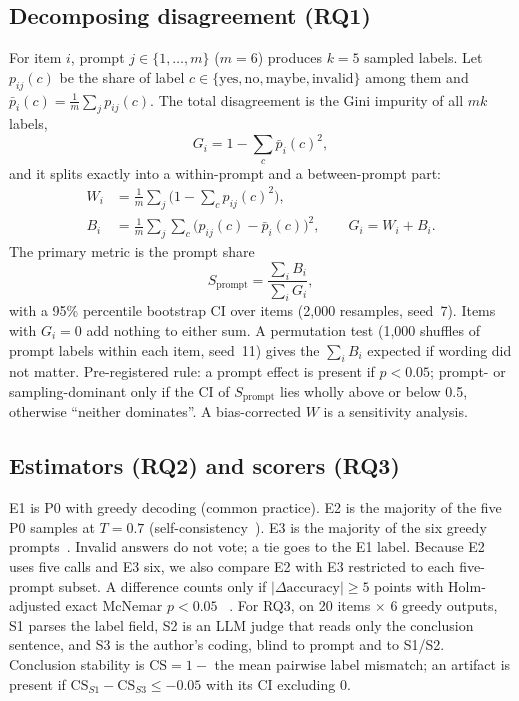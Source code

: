 \documentclass[conference]{IEEEtran}
\newcommand{\Sp}{S_{\mathrm{prompt}}}
\begin{document}
\subsection{Decomposing disagreement (RQ1)}
For item $i$, prompt $j \in \{1,\dots,m\}$ ($m = 6$) produces $k = 5$
sampled labels. Let $p_{ij}(c)$ be the share of label
$c \in \{\text{yes},\text{no},\text{maybe},\text{invalid}\}$ among them and
$\bar p_i(c) = \frac{1}{m}\sum_j p_{ij}(c)$. The total disagreement is the
Gini impurity of all $mk$ labels,
\begin{equation}
G_i = 1 - \sum_c \bar p_i(c)^2 ,
\end{equation}
and it splits exactly into a within-prompt and a between-prompt part:
\begin{align}
W_i &= \frac{1}{m}\sum_j \Big(1 - \sum_c p_{ij}(c)^2\Big),\\
B_i &= \frac{1}{m}\sum_j \sum_c \big(p_{ij}(c) - \bar p_i(c)\big)^2,
\qquad G_i = W_i + B_i .
\end{align}
The primary metric is the prompt share
\begin{equation}
\Sp = \frac{\sum_i B_i}{\sum_i G_i},
\end{equation}
with a 95\% percentile bootstrap CI over items (2{,}000 resamples,
seed~7). Items with $G_i = 0$ add nothing to either sum. A permutation
test (1{,}000 shuffles of prompt labels within each item, seed~11) gives
the $\sum_i B_i$ expected if wording did not matter. Pre-registered rule:
a prompt effect is present if $p < 0.05$; prompt- or sampling-dominant
only if the CI of $\Sp$ lies wholly above or below 0.5, otherwise
``neither dominates''. A bias-corrected $W$ is a sensitivity analysis.

\subsection{Estimators (RQ2) and scorers (RQ3)}
E1 is P0 with greedy decoding (common practice). E2 is the majority of
the five P0 samples at $T = 0.7$ (self-consistency~\cite{wang2023selfconsistency}).
E3 is the majority of the six greedy prompts~\cite{mizrahi2024state}.
Invalid answers do not vote; a tie goes to the E1 label. Because E2 uses
five calls and E3 six, we also compare E2 with E3 restricted to each
five-prompt subset. A difference counts only if $|\Delta\text{accuracy}|
\ge 5$ points with Holm-adjusted exact McNemar
$p < 0.05$~\cite{mcnemar1947note} . For RQ3, on 20 items $\times$ 6 greedy outputs, S1
parses the label field, S2 is an LLM judge that reads only the
conclusion sentence, and S3 is the author's coding, blind to prompt and to
S1/S2. Conclusion stability is $\mathrm{CS} = 1 -$ the mean pairwise label
mismatch; an artifact is present if $\mathrm{CS}_{S1} - \mathrm{CS}_{S3}
\le -0.05$ with its CI excluding 0.
\end{document}
